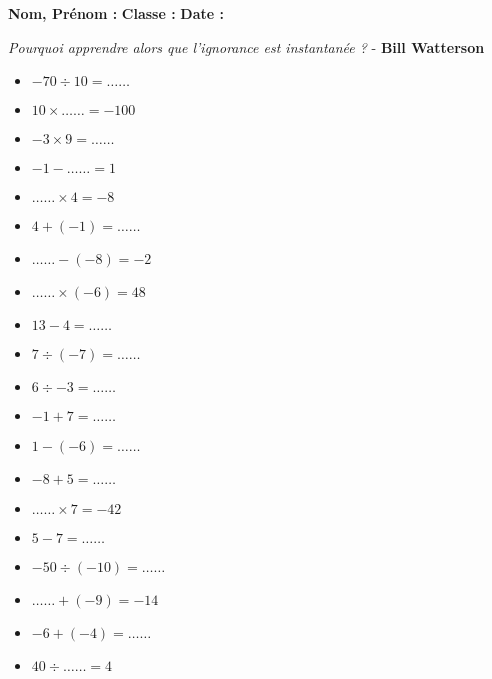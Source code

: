 \vspace{1cm}

  \textbf{Nom, Prénom :} \hspace{8cm} \textbf{Classe :} \hspace{3cm} \textbf{Date :}\\

  \vspace{-0.5cm} \begin{center}
    \textit{Pourquoi apprendre alors que l’ignorance est instantanée ?}  - \textbf{ Bill Watterson}
  \end{center}  \vspace{-0.5cm} 

\begin{multicols}{3}\noindent
    \begin{itemize}[label={$\bullet$}]
        \item $-70 \div 10 = \ldots\ldots$
        \item $10 \times \ldots\ldots = -100$
        \item $-3 \times 9 = \ldots\ldots$
        \item $-1 - \ldots\ldots = 1$
        \item $\ldots\ldots \times 4 = -8$
        \item $4 + \left( -1\right) = \ldots\ldots$
        \item $\ldots\ldots - \left( -8\right) = -2$
        \item $\ldots\ldots \times \left( -6\right) = 48$
        \item $13 - 4 = \ldots\ldots$
        \item $7 \div \left( -7\right) = \ldots\ldots$
        \item $6 \div -3 = \ldots\ldots$
        \item $-1 + 7 = \ldots\ldots$
        \item $1 - \left( -6\right) = \ldots\ldots$
        \item $-8 + 5 = \ldots\ldots$
        \item $\ldots\ldots \times 7 = -42$
        \item $5 - 7 = \ldots\ldots$
        \item $-50 \div \left( -10\right) = \ldots\ldots$
        \item $\ldots\ldots + \left( -9\right) = -14$
        \item $-6 + \left( -4\right) = \ldots\ldots$
        \item $40 \div \ldots\ldots = 4$
    \end{itemize}
  \end{multicols}

